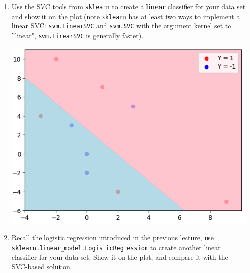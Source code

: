 \documentclass{assignment}
\begin{document}
\begin{problem}
\begin{enumerate}
\begin{enumerate}[label=(\alph*)]

        
        \item Use the SVC tools from \texttt{sklearn} to create a \textbf{linear} classifier for your data set and show it on the plot (note \texttt{sklearn} has at least two ways to implement a linear SVC: \texttt{svm.LinearSVC} and \texttt{svm.SVC} with the argument kernel set to ''linear", \texttt{svm.LinearSVC} is generally faster).

        \includegraphics[scale=.4]{474-HW4-Q5-b.png}


        
        \item Recall the logistic regression introduced in the previous lecture, use\\ 
        \texttt{sklearn.linear\_model.LogisticRegression} to create another linear classifier for your data set. Show it on the plot, and compare it with the SVC-based solution.


\end{enumerate}
\end{enumerate}
\end{problem}
\end{document}
